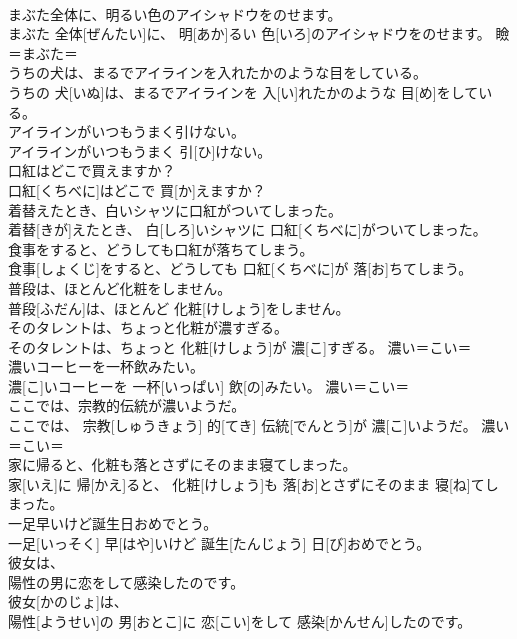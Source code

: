 \documentclass[8pt]{extreport}
\begin{document}
\begin{CJK}{UTF8}{min}
\\	まぶた全体に、明るい色のアイシャドウをのせます。	
\\	まぶた 全体[ぜんたい]に、 明[あか]るい 色[いろ]のアイシャドウをのせます。	瞼＝まぶた＝ 
\\	うちの犬は、まるでアイラインを入れたかのような目をしている。	
\\	うちの 犬[いぬ]は、まるでアイラインを 入[い]れたかのような 目[め]をしている。	
\\	アイラインがいつもうまく引けない。	
\\	アイラインがいつもうまく 引[ひ]けない。	
\\	口紅はどこで買えますか？	
\\	口紅[くちべに]はどこで 買[か]えますか？	
\\	着替えたとき、白いシャツに口紅がついてしまった。	
\\	着替[きが]えたとき、 白[しろ]いシャツに 口紅[くちべに]がついてしまった。	
\\	食事をすると、どうしても口紅が落ちてしまう。	
\\	食事[しょくじ]をすると、どうしても 口紅[くちべに]が 落[お]ちてしまう。	
\\	普段は、ほとんど化粧をしません。	
\\	普段[ふだん]は、ほとんど 化粧[けしょう]をしません。	
\\	そのタレントは、ちょっと化粧が濃すぎる。	
\\	そのタレントは、ちょっと 化粧[けしょう]が 濃[こ]すぎる。	濃い＝こい＝ 
\\	濃いコーヒーを一杯飲みたい。	
\\	濃[こ]いコーヒーを 一杯[いっぱい] 飲[の]みたい。	濃い＝こい＝ 
\\	ここでは、宗教的伝統が濃いようだ。	
\\	ここでは、 宗教[しゅうきょう] 的[てき] 伝統[でんとう]が 濃[こ]いようだ。	濃い＝こい＝ 
\\	家に帰ると、化粧も落とさずにそのまま寝てしまった。	
\\	家[いえ]に 帰[かえ]ると、 化粧[けしょう]も 落[お]とさずにそのまま 寝[ね]てしまった。	
\\	一足早いけど誕生日おめでとう。	
\\	一足[いっそく] 早[はや]いけど 誕生[たんじょう] 日[び]おめでとう。	
\\	彼女は、
\\	陽性の男に恋をして感染したのです。	
\\	彼女[かのじょ]は、 
\\	陽性[ようせい]の 男[おとこ]に 恋[こい]をして 感染[かんせん]したのです。	

\end{CJK}
\end{document}
